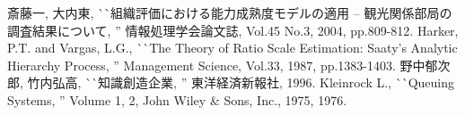 \documentclass[dvipdfmx]{issj}
\begin{document}
\begin{thebibliography}{99}
   斎藤一, 大内東, 
                       ^^ ^^ 組織評価における能力成熟度モデルの適用 -- 観光関係部局の調査結果について, '' 
                       情報処理学会論文誌, Vol.45 No.3, 2004, pp.809-812.
   Harker, P.T. and Vargas, L.G., 
                       ^^ ^^ The Theory of Ratio Scale Estimation: Saaty’s Analytic Hierarchy Process, '' 
                       Management Science, Vol.33, 1987, pp.1383-1403.
   野中郁次郎, 竹内弘高, ^^ ^^ 知識創造企業, '' 東洋経済新報社, 1996.
    Kleinrock L., 
                       ^^ ^^ Queuing Systems, '' Volume 1, 2, John Wiley \& Sons, Inc., 1975, 1976.
\end{thebibliography}
\end{document}
